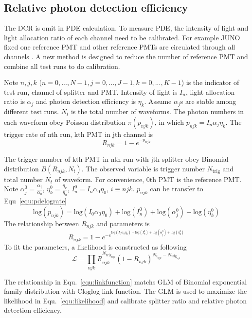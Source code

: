 \subsection{Relative photon detection efficiency}
The DCR is omit in PDE calculation. To measure PDE, the intensity of light and light allocation ratio of each channel need to be calibrated. For example JUNO fixed one reference PMT and other reference PMTs are circulated through all channels \cite{Wonsak_2021}. A new method is designed to reduce the number of reference PMT and combine all test runs to do calibration.

Note $n,j,k$ ($n=0,...,N-1, j=0,...,J-1, k=0,...,K-1$) is the indicator of test run, channel of splitter and PMT. Intensity of light is $I_n$, light allocation ratio is $\alpha_j$ and photon detection efficiency is $\eta_k$. Assume $\alpha_j$s are stable among different test runs. $N_t$ is the total number of waveforms. The photon numbers in each waveform obey Poisson distribution $\pi(p_{njk})$, in which $p_{njk}=I_n\alpha_j\eta_k$. The trigger rate of nth run, kth PMT in jth channel is
\begin{equation}
    \label{equ:pderate}
    R_{njk}=1-e^{-p_{njk}}
\end{equation}

The trigger number of kth PMT in nth run with jth splitter obey Binomial distribution $B(R_{njk},N_t)$. The observed variable is trigger number $N_{\mathrm{trig}}$ and total number $N_{t}$ of waveform. For convenience, 0th PMT is the reference PMT. Note $\alpha_j^0=\frac{\alpha_j}{\alpha_0}$, $\eta_k^0=\frac{\eta_k}{\eta_0}$, $I_n^0=I_n\alpha_0\eta_0$, $i\equiv njk$. $p_{njk}$ can be transfer to Equ~\eqref{equ:pdelograte}
\begin{equation}
    \label{equ:pdelograte}
    \mathrm{log}(p_{njk})=\mathrm{log}(I_0\alpha_0\eta_0)+\mathrm{log}(I_n^0)+\mathrm{log}(\alpha_j^0)+\mathrm{log}(\eta_k^0)
\end{equation}
The relationship between $R_{njk}$ and parameters is
\begin{equation}
    \label{equ:linkfunction}
    R_{njk}=1-e^{-e^{\mathrm{log}(I_0\alpha_0\eta_0)+\mathrm{log}(I_n^0)+\mathrm{log}(\alpha_j^0)+\mathrm{log}(\eta_k^0)}}
\end{equation}
To fit the parameters, a likelihood is constructed as following
\begin{equation}
    \label{equ:likelihood}
    \mathcal{L}=\prod_{njk}{R_{njk}^{N_{\mathrm{trig}_{njk}}}(1-R_{njk})^{N_{t_{njk}}-N_{\mathrm{trig}_{njk}}}}
\end{equation}

The relationship in Equ.~\eqref{equ:linkfunction} matchs GLM of Binomial exponential family distribution with Cloglog link function\cite{glm}. The GLM is used to maximize the likelihood in Equ.~\eqref{equ:likelihood} and calibrate splitter ratio and relative photon detection efficiency.